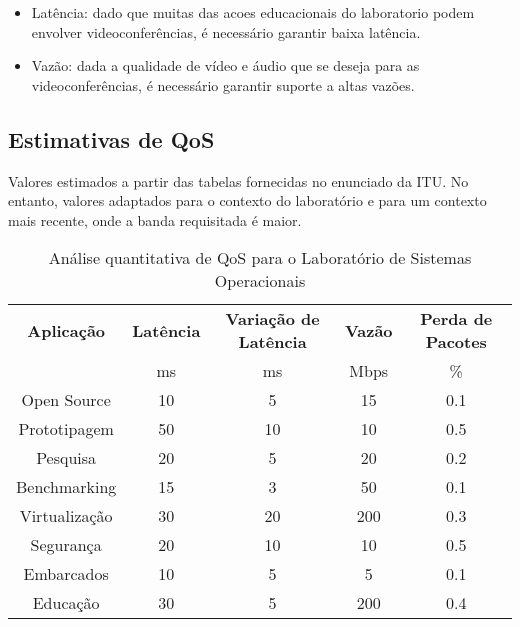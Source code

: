 \begin{itemize}
    \item Latência: dado que muitas das acoes educacionais do laboratorio
        podem envolver videoconferências, é necessário garantir baixa latência.
    \item Vazão: dada a qualidade de vídeo e áudio que se deseja
        para as videoconferências, é necessário garantir suporte
        a altas vazões.
\end{itemize}

\newpage
\subsection{Estimativas de QoS}

Valores estimados a partir das tabelas fornecidas no enunciado da ITU.
No entanto, valores adaptados para o contexto do laboratório e para
um contexto mais recente, onde a banda requisitada é maior.

\begin{table}[H]
    \centering
    \begin{tabular}{ccccc}
    \toprule
    \textbf{Aplicação} & \textbf{Latência} & \textbf{Variação de Latência} & \textbf{Vazão} & \textbf{Perda de Pacotes}\\
    & \footnotesize{ms} & \footnotesize{ms} & \footnotesize{Mbps} & \footnotesize{\%}\\
    \midrule
    Open Source & 10 & 5 & 15 & 0.1\\
    Prototipagem & 50 & 10 & 10 & 0.5\\
    Pesquisa & 20 & 5 & 20 & 0.2\\
    Benchmarking & 15 & 3 & 50 & 0.1\\
    Virtualização & 30 & 20 & 200 & 0.3\\
    Segurança & 20 & 10 & 10 & 0.5\\
    Embarcados & 10 & 5 & 5 & 0.1\\
    Educação & 30 & 5 & 200 & 0.4\\
    \bottomrule
    \end{tabular}
    \caption{Análise quantitativa de QoS para o Laboratório de Sistemas Operacionais}
    \label{tab:qos-so}
\end{table}
